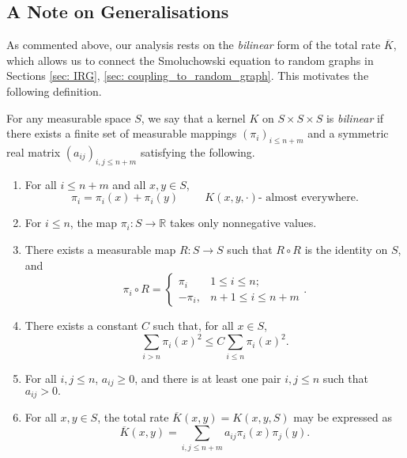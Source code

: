 \subsection{A Note on Generalisations} As commented above, our analysis rests on the \emph{bilinear} form of the total rate $\overline{K}$, which allows us to connect the Smoluchowski equation to random graphs in Sections \ref{sec: IRG}, \ref{sec: coupling_to_random_graph}. This motivates the following definition.
\begin{definition} For any measurable space $S$, we say that a kernel $K$ on $S\times S\times S$ is \emph{bilinear} if there exists a finite set of measurable mappings $(\pi_i)_{i\le n+m}$ and a symmetric real matrix $(a_{ij})_{i, j\le n+m}$ satisfying the following. 
\begin{enumerate}[label=\roman{*}).]
\item For all $i\le n+m$ and all $x,y\in S$, \begin{equation} \pi_i=\pi_i(x)+\pi_i(y) \hspace{1cm}K(x,y,\cdot)\text{- almost everywhere}. \end{equation} \item For $i\le n$, the map $\pi_i:S\rightarrow \mathbb{R}$ takes only nonnegative values.
\item There exists a measurable map $R: S\rightarrow S$ such that $R\circ R$ is the identity on $S$, and  \begin{equation} \pi_i \circ R=\begin{cases} \pi_i & 1\le i\le n; \\ -\pi_i, & n+1\le i \le n+m \end{cases}.  \end{equation}
\item There exists a constant $C$ such that, for all $x\in S$, \begin{equation} \sum_{i> n} \pi_i(x)^2 \le C \sum_{i\le n} \pi_i(x)^2. \end{equation} \item For all $i, j\le n$, $a_{ij}\ge 0$, and there is at least one pair $i, j\le n$ such that $a_{ij}>0.$
\item For all $x,y\in S$, the total rate $\overline{K}(x,y)=K(x,y,S)$ may be expressed as \begin{equation} \overline{K}(x,y)=\sum_{i,j\le n+m}a_{ij}\pi_i(x)\pi_j(y). \end{equation}  
\end{enumerate}  \end{definition}
